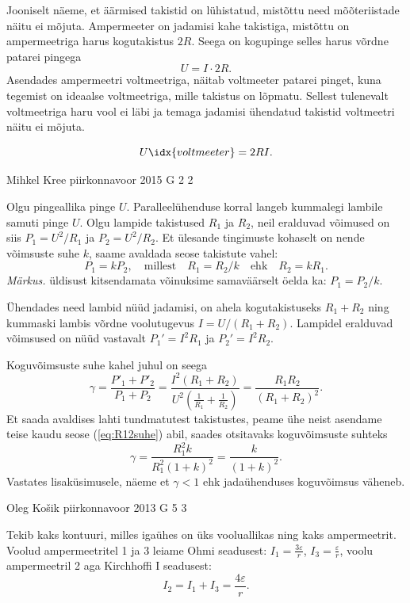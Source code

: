 \documentclass[11pt, twoside]{article}
\begin{document}
{{\ifSolution
Jooniselt näeme, et äärmised takistid on lühistatud, mistõttu need mõõteriistade näitu ei mõjuta. Ampermeeter on jadamisi kahe takistiga, mistõttu on ampermeetriga harus kogutakistus $2R$. Seega on kogupinge selles harus võrdne patarei pingega
\[ U = I\cdot 2R.\]
Asendades ampermeetri voltmeetriga, näitab voltmeeter patarei pinget, kuna tegemist on ideaalse voltmeetriga, mille takistus on lõpmatu. Sellest tulenevalt voltmeetriga haru vool ei läbi ja temaga jadamisi ühendatud takistid voltmeetri näitu ei mõjuta.

\[ U\idx{voltmeeter} = 2RI.\]
\fi
}

{Mihkel Kree} %
{piirkonnavoor} %
{2015} %
{G 2} %
{2} %
{

\ifSolution
Olgu pingeallika pinge $U$. Paralleelühenduse korral langeb kummalegi lambile samuti pinge $U$. Olgu lampide takistused $R_1$ ja $R_2$, neil eralduvad võimused on siis $P_1=U^2/R_1$ ja $P_2=U^2/R_2$. Et ülesande tingimuste kohaselt on nende võimsuste suhe $k$, saame avaldada seose takistute vahel:
\begin{equation}
\label{eq:R12suhe}
P_1 = kP_2, \quad \text{millest} \quad R_1 = R_2/k \quad \text{ehk} \quad R_2=kR_1.
\end{equation}
\emph{Märkus.} üldisust kitsendamata võinuksime samaväärselt öelda ka: $P_1 = P_2/k$.

Ühendades need lambid nüüd jadamisi, on ahela kogutakistuseks $R_1+R_2$ ning kummaski lambis võrdne voolutugevus $I=U/(R_1+R_2)$. Lampidel eralduvad võimsused on nüüd vastavalt $P_1'=I^2R_1$ ja $P_2'=I^2R_2$.

Koguvõimsuste suhe kahel juhul on seega
\[
\gamma = \frac{P'_1+P'_2}{P_1+P_2} = \frac{I^2(R_1+R_2)}{U^2(\frac{1}{R_1}+\frac{1}{R_2})}=
\frac{R_1R_2}{(R_1+R_2)^2}.
\]
Et saada avaldises lahti tundmatutest takistustes, peame ühe neist asendame teise kaudu seose (\ref{eq:R12suhe}) abil, saades otsitavaks koguvõimsuste suhteks
\[
\gamma = \frac{R_1^2 k}{R_1^2(1+k)^2} = \frac{k}{(1+k)^2}.
\]
Vastates lisaküsimusele, näeme et $\gamma < 1$ ehk jadaühenduses koguvõimsus väheneb.
\fi
}

{Oleg Košik} %
{piirkonnavoor} %
{2013} %
{G 5} %
{3} %
{

\ifSolution
\osa Tekib kaks kontuuri, milles igaühes on üks vooluallikas ning kaks ampermeetrit. Voolud ampermeetritel 1 ja 3 leiame Ohmi seadusest: $I_1=\frac{3\varepsilon}{r}$, $I_3=\frac{\varepsilon}{r}$, voolu ampermeetril 2 aga Kirchhoffi I seadusest: 
\[
I_2=I_1+I_3=\frac{4\varepsilon}{r}.
\]

}}
\end{document}
